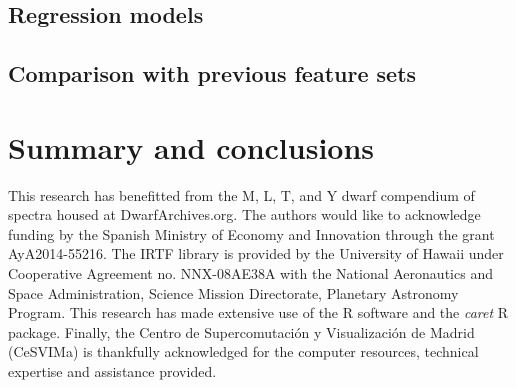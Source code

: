 \documentclass[printer]{aa}
\begin{document}
\subsection{Regression models}

\subsection{Comparison with previous feature sets}


\section{Summary and conclusions}
\label{sec:summary}


\begin{acknowledgements}
This research has benefitted from the M, L, T, and Y dwarf compendium
of spectra housed at DwarfArchives.org.  The authors would like to
acknowledge funding by the Spanish Ministry of Economy and Innovation
through the grant AyA2014-55216. The IRTF library is provided by the
University of Hawaii under Cooperative Agreement no. NNX-08AE38A with
the National Aeronautics and Space Administration, Science Mission
Directorate, Planetary Astronomy Program. This research has made
extensive use of the R software \cite{R} and the {\it caret} R
package. Finally, the Centro de Supercomutaci\'on y Visualizaci\'on 
de Madrid (CeSVIMa) is thankfully acknowledged for the computer
resources, technical expertise and assistance provided.
\end{acknowledgements}


{}


\begin{appendix}
\label{app}



\end{appendix}
\end{document}
